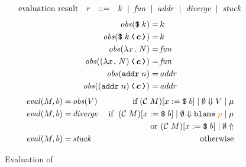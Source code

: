{\color{NavyBlue}   %

  \begin{figure}[tbp]
    \raggedright
        \[
          \begin{array}{rcll}
            \text{evaluation result}     & r & ::=  & k \;\mid\; \mathit{fun} \;\mid\; \mathit{addr} \;\mid\; \mathit{diverge} \;\mid\; \mathit{stuck}
          \end{array}
        \]
        \begin{align*}
          \mathit{obs}(\ccconst{k}) =&\, k \\
          \mathit{obs}(\cccast{\ccconst{k}}{\bm{c}}) =&\, k \\
          \mathit{obs}(\cclam{x}{N}) =&\, \mathit{fun} \\
          \mathit{obs}(\cccast{(\cclam{x}{N})}{\bm{c}}) =&\, \mathit{fun} \\
          \mathit{obs}(\ccaddr{n}) =&\, \mathit{addr} \\
          \mathit{obs}(\cccast{(\ccaddr{n})}{\bm{c}}) =&\, \mathit{addr}
        \end{align*}
        \begin{align*}
          \mathit{eval}(M, b) =&\, \mathit{obs}(V)\;&\text{if}\;(\compile{M})[x:=\ccconst{b}] \mid \emptyset \Downarrow V \mid \mu \\
          \mathit{eval}(M, b) =&\, \mathit{diverge} \;&\text{if~}\;(\compile{M})[x:=\ccconst{b}] \mid \emptyset \Downarrow \blame{\bl{p}} \mid \mu \\
                                                    & &\text{or}~ (\compile{M})[x:=\ccconst{b}] \mid \emptyset \Uparrow \\
          \mathit{eval}(M, b) =&\, \mathit{stuck}\;&\text{otherwise}
        \end{align*}
        \caption{Evaluation of \Surface}
        \label{fig:eval}
  \end{figure}

}
